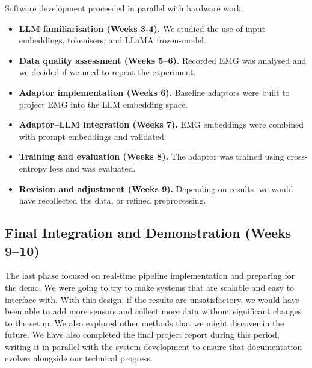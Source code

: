 Software development proceeded in parallel with hardware work.

\begin{itemize}
    \item \textbf{LLM familiarisation (Weeks 3-4).} We studied the use of input embeddings, tokenisers, and LLaMA frozen-model.
    \item \textbf{Data quality assessment (Weeks 5--6).} Recorded EMG was analysed and we decided if we need to repeat the experiment.
    \item \textbf{Adaptor implementation (Weeks 6).} Baseline adaptors were built to project EMG into the LLM embedding space.
    \item \textbf{Adaptor--LLM integration (Weeks 7).} EMG embeddings were combined with prompt embeddings and validated.
    \item \textbf{Training and evaluation (Weeks 8).} The adaptor was trained using cross-entropy loss and was evaluated.
    \item \textbf{Revision and adjustment (Weeks 9).} Depending on results, we would have recollected the data, or refined preprocessing.
\end{itemize}

\subsection{Final Integration and Demonstration (Weeks 9--10)}

The last phase focused on real-time pipeline implementation and preparing for the demo. We were going to try to make systems that are scalable and easy to interface with. With this design, if the results are unsatisfactory, we would have been able to add more sensors and collect more data without significant changes to the setup. We also explored other methods that we might discover in the future. We have also completed the final project report during this period, writing it in parallel with the system development to ensure that documentation evolves alongside our technical progress.
